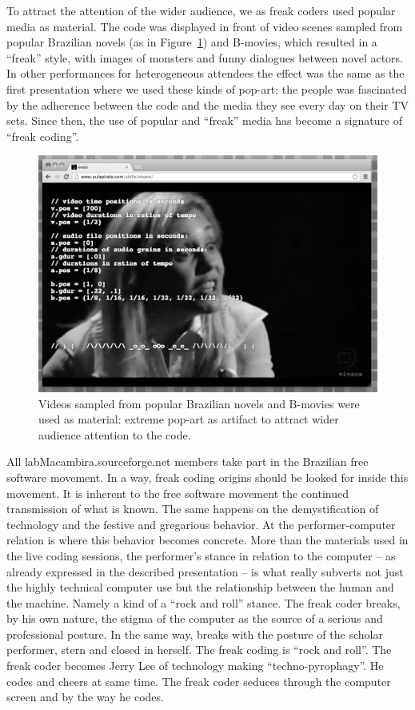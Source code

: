 \documentclass[12pt,times,twocolumn]{article}
\begin{document}
To attract the attention of the wider audience, we as freak coders
used popular media as material. The code was displayed in front of
video scenes sampled from popular Brazilian novels (as in
Figure~\ref{fig:novela}) and B-movies, which resulted in a ``freak'' style,
with images of monsters and funny dialogues between novel actors. In
other performances for heterogeneous attendees the effect was the same
as the first presentation where we used these kinds of pop-art: the
people was fascinated by the adherence between the code and the media
they see every day on their TV sets. Since then, the use of popular and
``freak'' media has become a signature of ``freak coding''.

\begin{figure}[htpb]
  \begin{center}
    \includegraphics[scale=.3]{img/fig_novela_.png}
    \caption{Videos sampled from popular Brazilian novels and B-movies
      were used as material: extreme pop-art as artifact to attract
      wider audience attention to the code.}
    \label{fig:novela}
  \end{center}
\end{figure}

All labMacambira.sourceforge.net members take part in the Brazilian
free software movement. In a way, freak coding origins should be
looked for inside this movement. It is inherent to the free software
movement the continued transmission of what is known. The same happens
on the demystification of technology and the festive and gregarious
behavior. At the performer-computer relation is where this behavior
becomes concrete. More than the materials used in the live coding
sessions, the performer's stance in relation to the computer -- as
already expressed in the described presentation -- is what really
subverts not just the highly technical computer use but the
relationship between the human and the machine. Namely a kind of a
``rock and roll'' stance. The freak coder breaks, by his own nature,
the stigma of the computer as the source of a serious and professional
posture. In the same way, breaks with the posture of the scholar
performer, stern and closed in herself. The freak coding is ``rock and
roll''. The freak coder becomes Jerry Lee of technology making
``techno-pyrophagy''. He codes and cheers at same time. The freak
coder seduces through the computer screen and by the way he codes.
\end{document}
